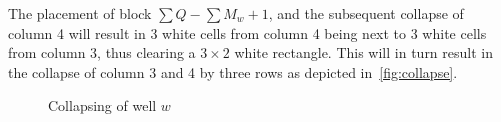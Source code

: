 The placement of block $\sum Q - \sum M_w + 1$, and the subsequent collapse of column 4 will result in 3 white cells from column 4 being next to 3 white cells from column 3, thus clearing a $3 \times 2$ white rectangle. This will in turn result in the collapse of column 3 and 4 by three rows as depicted in~\autoref{fig:collapse}.

\begin{figure}[H]
    \centering
    \caption{Collapsing of well $w$}
    \label{fig:collapse}
\end{figure}
